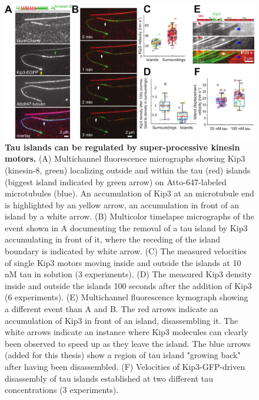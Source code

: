 \begin{figure}[h!]
\centering
\includegraphics[width=1\linewidth]{Figures/taukip3.png}
\caption[Tau islands can be regulated by super-processive kinesin motors.]{
\textbf{Tau islands can be regulated by super-processive kinesin motors.} (A) Multichannel fluorescence micrographs showing Kip3 (kinesin-8, green) localizing outside and within the tau (red) islands (biggest island indicated by green arrow) on Atto-647-labeled microtubules (blue). An accumulation of Kip3 at an microtubule end is highlighted by an yellow arrow, an accumulation in front of an island by a white arrow. (B) Multicolor timelapse micrographs of the event shown in A documenting the removal of a tau island by Kip3 accumulating in front of it, where the receding of the island boundary is indicated by white arrow. (C) The measured velocities of single Kip3 motors moving inside and outside the islands at 10 nM tau in solution (3 experiments). (D) The measured Kip3 density inside and outside the islands 100 seconds after the addition of Kip3 (6 experiments). (E) Multichannel fluorescence kymograph showing a different event than A and B. The red arrows indicate an accumulation of Kip3 in front of an island, disassembling it. The white arrows indicate an instance where Kip3 molecules can clearly been observed to speed up as they leave the island. The blue arrows (added for this thesis) show a region of tau island "growing back" after having been disassembled. (F) Velocities of Kip3-GFP-driven disassembly of tau islands established at two different tau concentrations (3 experiments).
	}\label{taukip3}
\end{figure}

